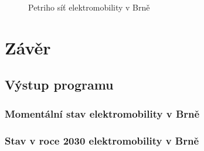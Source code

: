 \documentclass[a4paper,11pt]{article}
\begin{document}
\begin{figure}[H]
    \centering
    \caption{Petriho síť elektromobility v Brně}
    \label{figure:ims-petri-net}
\end{figure}

\section{Závěr}

\subsection{Výstup programu}

\subsubsection{Momentální stav elektromobility v Brně}

\subsubsection{Stav v roce 2030 elektromobility v Brně}

\newpage

      
\end{document}
